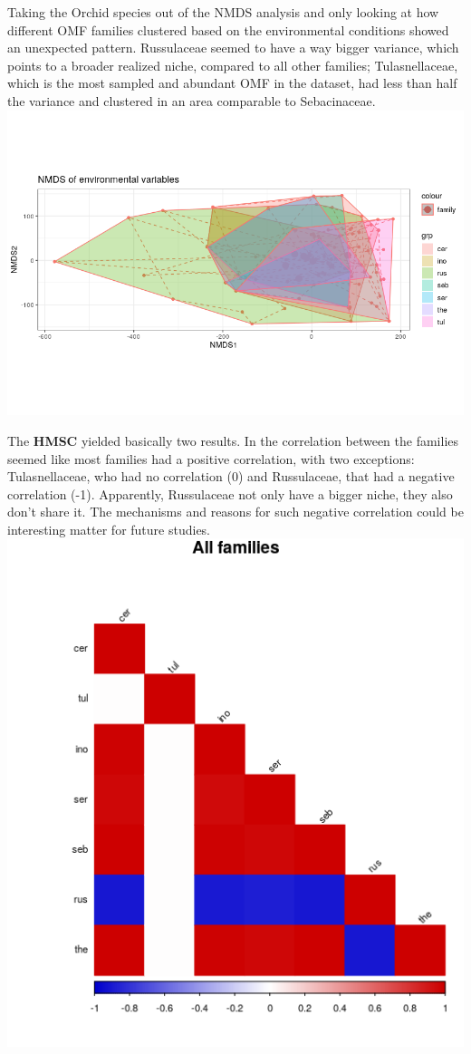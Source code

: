 Taking the Orchid species out of the NMDS analysis and only looking at how different OMF families clustered based on the environmental conditions showed an unexpected pattern. Russulaceae seemed to have a way bigger variance, which points to a broader realized niche, compared to all other families; Tulasnellaceae, which is the most sampled and abundant OMF in the dataset, had less than half the variance and clustered in an area comparable to Sebacinaceae.
\includegraphics[keepaspectratio,width=\textwidth,height=0.75\textheight]{images/nmdsEnvMatrix.png}

The \textbf{HMSC} yielded basically two results.
In the correlation between the families seemed like most families had a positive correlation, with two exceptions: Tulasnellaceae, who had no correlation (0) and Russulaceae, that had a negative correlation (-1). Apparently, Russulaceae not only have a bigger niche, they also don't share it. The mechanisms and reasons for such negative correlation could be interesting matter for future studies. \includegraphics[keepaspectratio,width=\textwidth,height=0.75\textheight]{images/corrLump.png}

